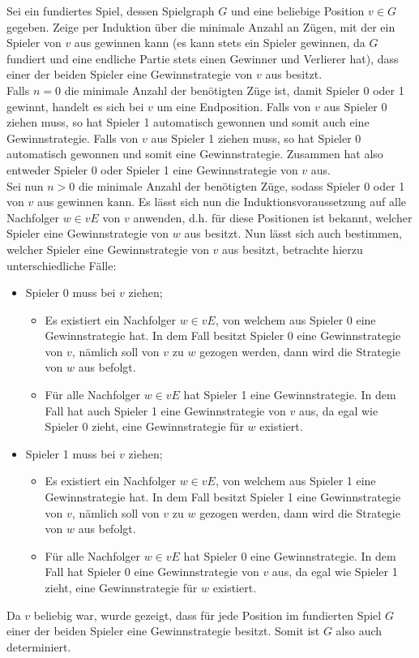 \documentclass[11pt, a4paper]{article}
\begin{document}
\begin{adjustwidth}{20pt}{20pt}
	Sei ein fundiertes Spiel, dessen Spielgraph $G$ und eine beliebige Position $v \in G$ gegeben. Zeige per Induktion über die minimale Anzahl an Zügen, mit der ein Spieler
	von $v$ aus gewinnen kann (es kann stets ein Spieler gewinnen, da $G$ fundiert und eine endliche Partie stets einen Gewinner und Verlierer hat), dass einer der beiden Spieler
	eine Gewinnstrategie von $v$ aus besitzt.\\
	Falls $n=0$ die minimale Anzahl der benötigten Züge ist, damit Spieler 0 oder 1 gewinnt, handelt es sich bei $v$ um eine Endposition. Falls von $v$ aus Spieler 0 ziehen muss, so hat
	Spieler 1 automatisch gewonnen und somit auch eine Gewinnstrategie. Falls von $v$ aus Spieler 1 ziehen muss, so hat Spieler 0 automatisch gewonnen und somit eine Gewinnstrategie. Zusammen
	hat also entweder Spieler 0 oder Spieler 1 eine Gewinnstrategie von $v$ aus. \\
	Sei nun $n>0$ die minimale Anzahl der benötigten Züge, sodass Spieler 0 oder 1 von $v$ aus gewinnen kann. Es lässt sich nun die Induktionsvoraussetzung auf alle Nachfolger $w \in vE$ von
	$v$ anwenden, d.h. für diese Positionen ist bekannt, welcher Spieler eine Gewinnstrategie von $w$ aus besitzt. Nun lässt sich auch bestimmen, welcher Spieler eine Gewinnstrategie
	von $v$ aus besitzt, betrachte hierzu unterschiedliche Fälle:
	\begin{itemize}
	\item Spieler 0 muss bei $v$ ziehen;
	\begin{itemize}
	\item Es existiert ein Nachfolger $w \in vE$, von welchem aus Spieler 0 eine Gewinnstrategie hat. In dem Fall besitzt Spieler 0 eine Gewinnstrategie von $v$, nämlich soll von
	$v$ zu $w$ gezogen werden, dann wird die Strategie von $w$ aus befolgt.
	\item Für alle Nachfolger $w \in vE$ hat Spieler 1 eine Gewinnstrategie. In dem Fall hat auch Spieler 1 eine Gewinnstrategie von $v$ aus, da egal wie Spieler 0 zieht, eine Gewinnstrategie
	für $w$ existiert.
	\end{itemize}
	\item Spieler 1 muss bei $v$ ziehen;
	\begin{itemize}
	\item Es existiert ein Nachfolger $w \in vE$, von welchem aus Spieler 1 eine Gewinnstrategie hat. In dem Fall besitzt Spieler 1 eine Gewinnstrategie von $v$, nämlich soll von
	$v$ zu $w$ gezogen werden, dann wird die Strategie von $w$ aus befolgt.
	\item Für alle Nachfolger $w \in vE$ hat Spieler 0 eine Gewinnstrategie. In dem Fall hat Spieler 0 eine Gewinnstrategie von $v$ aus, da egal wie Spieler 1 zieht, eine Gewinnstrategie
	für $w$ existiert.
	\end{itemize}
	\end{itemize}
	Da $v$ beliebig war, wurde gezeigt, dass für jede Position im fundierten Spiel $G$ einer der beiden Spieler eine Gewinnstrategie besitzt. Somit ist $G$ also auch determiniert.
	
\end{adjustwidth}
\end{document}
